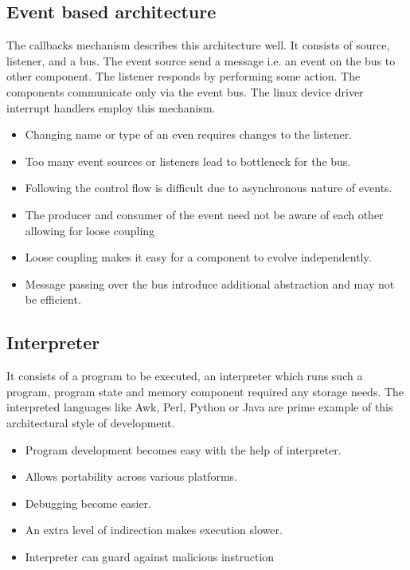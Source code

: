 \documentclass[conference]{IEEEtran}
\begin{document}
\subsection{Event based architecture}
The callbacks mechanism describes this architecture well. It consists of source, listener, and a bus. The event source send a message i.e. an event on the bus to other component. The listener responds by performing some action. The components communicate only via the event bus. The linux device driver interrupt handlers employ this mechanism. 
\begin{itemize}
\item Changing name or type of an even requires changes to the listener.
\item Too many event sources or listeners lead to bottleneck for the bus.
\item Following the control flow is difficult due to asynchronous nature of events.
\item The producer and consumer of the event need not be aware of each other allowing for loose coupling
\item Loose coupling makes it easy for a component to evolve independently.
\item Message passing over the bus introduce additional abstraction and may not be efficient.
\end{itemize}

\subsection{Interpreter}
It consists of a program to be executed, an interpreter which runs such a program, program state and memory component required any storage needs. The interpreted languages like Awk, Perl, Python or Java are prime example of this architectural style of development.
\begin{itemize}
\item Program development becomes easy with the help of interpreter.
\item Allows portability across various platforms.
\item Debugging become easier.
\item An extra level of indirection makes execution slower.
\item Interpreter can guard against malicious instruction 
\end{itemize}
\end{document}
